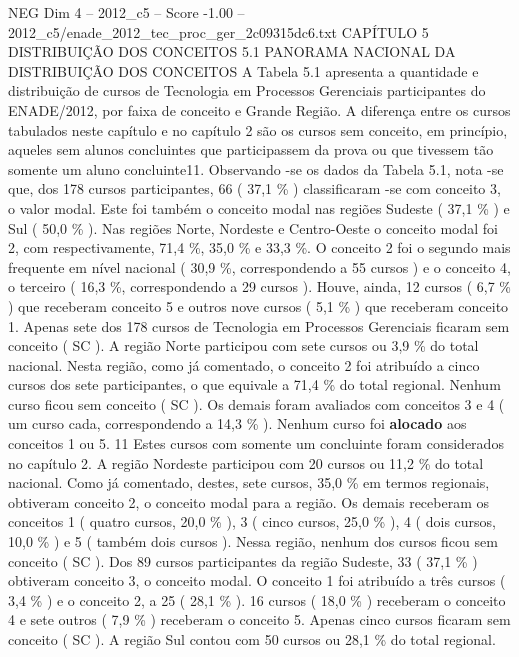 \begin{textsample}{NEG Dim 4 – 2012\_c5 – Score -1.00 – 2012\_c5/enade\_2012\_tec\_proc\_ger\_2c09315dc6.txt}  \label{ex:f4_neg_102}
CAPÍTULO 5 DISTRIBUIÇÃO DOS CONCEITOS 5.1 PANORAMA NACIONAL DA DISTRIBUIÇÃO DOS CONCEITOS A Tabela 5.1 apresenta a quantidade e distribuição de cursos de Tecnologia em Processos Gerenciais participantes do ENADE/2012, por faixa de conceito e Grande Região.
A diferença entre os cursos tabulados neste capítulo e no capítulo 2 são os cursos sem conceito, em princípio, aqueles sem alunos concluintes que participassem da prova ou que tivessem tão somente um aluno concluinte11.
Observando -se os dados da Tabela 5.1, nota -se que, dos 178 cursos participantes, 66 ( 37,1 \% ) classificaram -se com conceito 3, o valor modal.
Este foi também o conceito modal nas regiões Sudeste ( 37,1 \% ) e Sul ( 50,0 \% ).
Nas regiões Norte, Nordeste e Centro-Oeste o conceito modal foi 2, com respectivamente, 71,4 \%, 35,0 \% e 33,3 \%.
O conceito 2 foi o segundo mais frequente em nível nacional ( 30,9 \%, correspondendo a 55 cursos ) e o conceito 4, o terceiro ( 16,3 \%, correspondendo a 29 cursos ).
Houve, ainda, 12 cursos ( 6,7 \% ) que receberam conceito 5 e outros nove cursos ( 5,1 \% ) que receberam conceito 1.
Apenas sete dos 178 cursos de Tecnologia em Processos Gerenciais ficaram sem conceito ( SC ).
A região Norte participou com sete cursos ou 3,9 \% do total nacional.
Nesta região, como já comentado, o conceito 2 foi atribuído a cinco cursos dos sete participantes, o que equivale a 71,4 \% do total regional.
Nenhum curso ficou sem conceito ( SC ).
Os demais foram avaliados com conceitos 3 e 4 ( um curso cada, correspondendo a 14,3 \% ).
Nenhum curso foi \textbf{alocado} aos conceitos 1 ou 5. 11 Estes cursos com somente um concluinte foram considerados no capítulo 2.
A região Nordeste participou com 20 cursos ou 11,2 \% do total nacional.
Como já comentado, destes, sete cursos, 35,0 \% em termos regionais, obtiveram conceito 2, o conceito modal para a região.
Os demais receberam os conceitos 1 ( quatro cursos, 20,0 \% ), 3 ( cinco cursos, 25,0 \% ), 4 ( dois cursos, 10,0 \% ) e 5 ( também dois cursos ).
Nessa região, nenhum dos cursos ficou sem conceito ( SC ).
Dos 89 cursos participantes da região Sudeste, 33 ( 37,1 \% ) obtiveram conceito 3, o conceito modal.
O conceito 1 foi atribuído a três cursos ( 3,4 \% ) e o conceito 2, a 25 ( 28,1 \% ). 16 cursos ( 18,0 \% ) receberam o conceito 4 e sete outros ( 7,9 \% ) receberam o conceito 5.
Apenas cinco cursos ficaram sem conceito ( SC ).
A região Sul contou com 50 cursos ou 28,1 \% do total regional.

\end{textsample}

